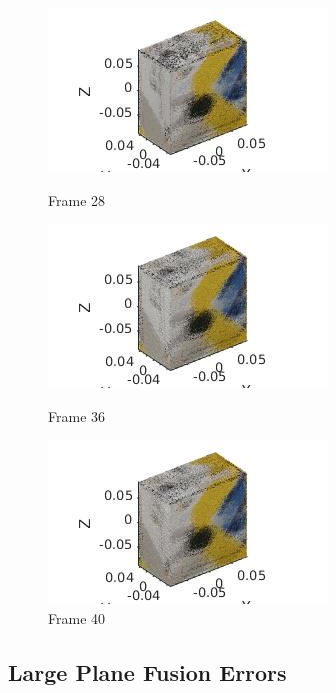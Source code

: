 \documentclass[10pt,a4paper]{article}
\begin{document}
\begin{figure}[!h]
	\begin{minipage}[t]{0.33 \linewidth}
		
		\centering
		\includegraphics[scale=0.5]{box/28.jpg}
		\caption{ \small Frame 28}
	\end{minipage}
	\begin{minipage}[t]{0.33 \linewidth}
		\centering
		\includegraphics[scale=0.5]{box/36.jpg}
		\caption{ \small Frame 36}
	\end{minipage}
	\begin{minipage}[t]{0.33 \linewidth}
		\centering
		\includegraphics[scale=0.5]{box/40.jpg}
		\caption{ \small Frame 40}
	\end{minipage}
\end{figure}

\newpage


\subsection{Large Plane Fusion Errors}
\end{document}
